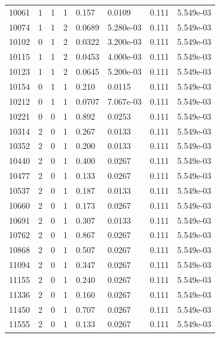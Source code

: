 \documentclass[preview]{standalone}
\begin{document}
{{{{{{{{{{{{{\begin{tabular}{L{1.2cm}C{1.2cm} C{0.3cm}C{0.5cm} C{1.4cm}C{1.4cm} C{1.4cm}C{1.4cm}}
  10061  &     1  & 1     &  1 &  0.157  & 0.0109  & 0.111 &  5.549e-03   \\ 
  10074  &     1  & 1     &  2 &  0.0689  & 5.280e-03  & 0.111 &  5.549e-03   \\ 
  10102  &     0  & 1     &  2 &  0.0322  & 3.200e-03  & 0.111 &  5.549e-03   \\ 
  10115  &     1  & 1     &  2 &  0.0453  & 4.000e-03  & 0.111 &  5.549e-03   \\ 
  10123  &     1  & 1     &  2 &  0.0645  & 5.200e-03  & 0.111 &  5.549e-03   \\ 
  10154  &     0  & 1     &  1 &  0.210  & 0.0115  & 0.111 &  5.549e-03   \\ 
  10212  &     0  & 1     &  1 &  0.0707  & 7.067e-03  & 0.111 &  5.549e-03   \\ 
  10221  &     0  & 0     &  1 &  0.892  & 0.0253  & 0.111 &  5.549e-03   \\ 
  10314  &     2  & 0     &  1 &  0.267  & 0.0133  & 0.111 &  5.549e-03   \\ 
  10352  &     2  & 0     &  1 &  0.200  & 0.0133  & 0.111 &  5.549e-03   \\ 
  10440  &     2  & 0     &  1 &  0.400  & 0.0267  & 0.111 &  5.549e-03   \\ 
  10477  &     2  & 0     &  1 &  0.133  & 0.0267  & 0.111 &  5.549e-03   \\ 
  10537  &     2  & 0     &  1 &  0.187  & 0.0133  & 0.111 &  5.549e-03   \\ 
  10660  &     2  & 0     &  1 &  0.173  & 0.0267  & 0.111 &  5.549e-03   \\ 
  10691  &     2  & 0     &  1 &  0.307  & 0.0133  & 0.111 &  5.549e-03   \\ 
  10762  &     2  & 0     &  1 &  0.867  & 0.0267  & 0.111 &  5.549e-03   \\ 
  10868  &     2  & 0     &  1 &  0.507  & 0.0267  & 0.111 &  5.549e-03   \\ 
  11094  &     2  & 0     &  1 &  0.347  & 0.0267  & 0.111 &  5.549e-03   \\ 
  11155  &     2  & 0     &  1 &  0.240  & 0.0267  & 0.111 &  5.549e-03   \\ 
  11336  &     2  & 0     &  1 &  0.160  & 0.0267  & 0.111 &  5.549e-03   \\ 
  11450  &     2  & 0     &  1 &  0.707  & 0.0267  & 0.111 &  5.549e-03   \\ 
  11555  &     2  & 0     &  1 &  0.133  & 0.0267  & 0.111 &  5.549e-03   \\ 

\end{tabular}}}}}}}}}}}}}}
\end{document}
